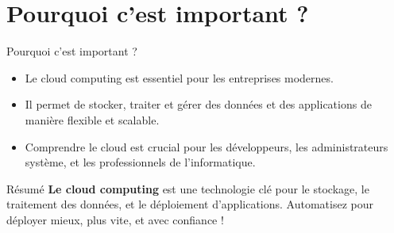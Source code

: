 \documentclass{clbeamer2024}
\begin{document}
\section{Pourquoi c'est important ?}
\begin{frame}{Pourquoi c'est important ?}
	\begin{itemize}
		\item Le cloud computing est essentiel pour les entreprises modernes.
		\item Il permet de stocker, traiter et gérer des données et des applications de manière flexible et scalable.
		\item Comprendre le cloud est crucial pour les développeurs, les administrateurs système, et les professionnels de l'informatique.
	\end{itemize}
\end{frame}


\begin{frame}{Résumé}
	\textbf{Le cloud computing} est une technologie clé pour le stockage, le traitement des données, et le déploiement d'applications.  
	Automatisez pour déployer mieux, plus vite, et avec confiance !
\end{frame}

	
	
\end{document}
